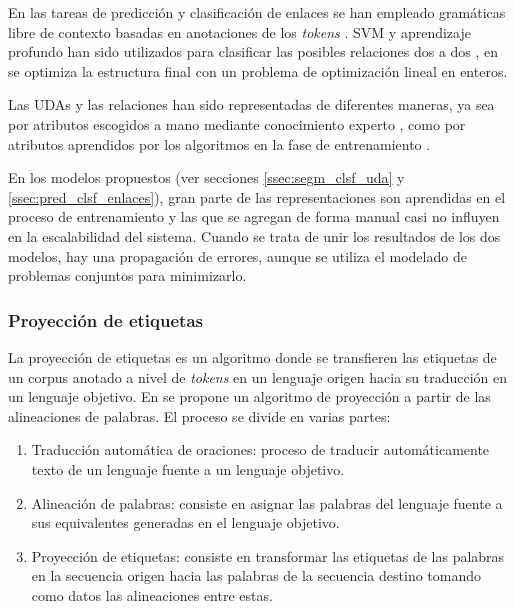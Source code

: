 \documentclass{rcci} %
\begin{document}
En las tareas de predicci\'on y clasificaci\'on de enlaces se han empleado gram\'aticas libre de contexto 
basadas en anotaciones de los \textit{tokens} \cite{palau2009argumentation}. SVM y aprendizaje profundo han sido utilizados para clasificar 
las posibles relaciones dos a dos \cite{goudas2015argument,galassi2021deep}, en \citep{goudas2015argument}
se optimiza la estructura final con un problema de optimizaci\'on lineal en enteros.

Las UDAs y las relaciones han sido representadas de diferentes maneras, ya sea por 
atributos escogidos a mano mediante conocimiento experto \cite{palau2009argumentation,goudas2015argument}, como
por atributos aprendidos por los algoritmos en la fase de entrenamiento \cite{eger2017neural,galassi2021deep}.

En los modelos propuestos (ver secciones \ref{ssec:segm_clsf_uda} y \ref{ssec:pred_clsf_enlaces}), gran parte de las representaciones son aprendidas en el proceso de 
entrenamiento y las que se agregan de forma manual casi no influyen en la escalabilidad del sistema.
Cuando se trata de unir los resultados de los dos modelos, hay una propagaci\'on de errores, 
aunque se utiliza el modelado de problemas conjuntos para minimizarlo.

\subsubsection*{Proyecci\'on de etiquetas} %

La proyecci\'on de etiquetas es un algoritmo donde se 
transfieren las etiquetas de un corpus anotado a nivel de \textit{tokens} en un lenguaje origen hacia su traducci\'on en un
lenguaje objetivo. En \cite{eger2018cross} se propone un algoritmo de proyecci\'on a partir de las alineaciones de 
palabras. El proceso se divide en varias partes:

\begin{enumerate}
	\item Traducci\'on autom\'atica de oraciones: proceso de
	traducir autom\'aticamente texto de un lenguaje fuente a un lenguaje objetivo.
	\item Alineaci\'on de palabras: consiste en asignar las palabras del lenguaje fuente
	a sus equivalentes generadas en el lenguaje objetivo.
	\item Proyecci\'on de etiquetas: consiste en transformar las etiquetas de las palabras en la secuencia origen
	hacia las palabras de la secuencia destino tomando como datos las alineaciones entre estas.
\end{enumerate}
\end{document}
